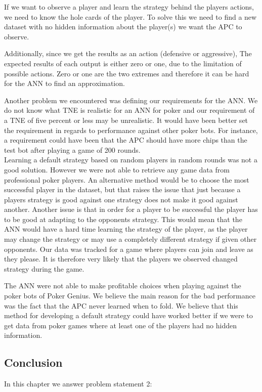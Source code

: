 If we want to observe a player and learn the strategy behind the players actions, we need to know the hole cards of the player. To solve this we need to find a new dataset with no hidden information about the player(s) we want the APC to observe.

Additionally, since we get the results as an action (defensive or aggressive), The expected results of each output is either zero or one, due to the limitation of possible actions. Zero or one are the two extremes and therefore it can be hard for the ANN to find an approximation. 

Another problem we encountered was defining our requirements for the ANN. We do not know what TNE is realistic for an ANN for poker and our requirement of a TNE of five percent or less may be unrealistic. It would have been better set the requirement in regards to performance against other poker bots. For instance, a requirement could have been that the APC should have more chips than the test bot after playing a game of 200 rounds. \\

Learning a default strategy based on random players in random rounds was not a good solution. However we were not able to retrieve any game data from professional poker players.
An alternative method would be to choose the most successful player in the dataset, but that raises the issue that just because a players strategy is good against one strategy does not make it good against another.
Another issue is that in order for a player to be successful the player has to be good at adapting to the opponents strategy. This would mean that the ANN would have a hard time learning the strategy of the player, as the player may change the strategy or may use a completely different strategy if given other opponents. Our data was tracked for a game where players can join and leave as they please. It is therefore very likely that the players we observed changed strategy during the game. 

The ANN were not able to make profitable choices when playing against the poker bots of Poker Genius. We believe the main reason for the bad performance was the fact that the APC never learned when to fold. We believe that this method for developing a default strategy could have worked better if we were to get data from poker games where at least one of the players had no hidden information.

\subsection{Conclusion}
In this chapter we answer problem statement 2:

